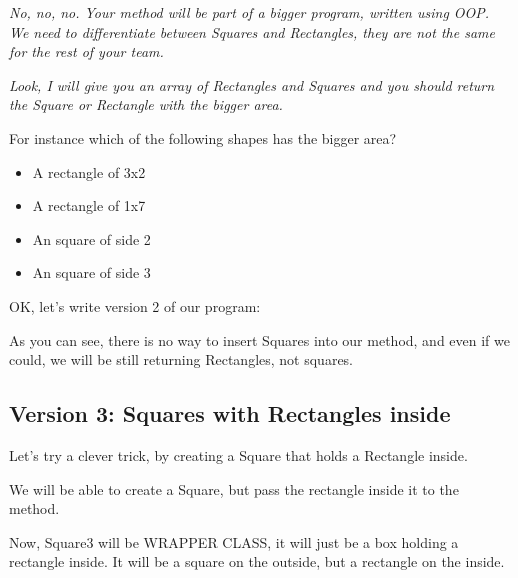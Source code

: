 \documentclass[a4paper, 9pt]{extarticle}
\begin{document}
\textsl{No, no, no. Your method will be part of a bigger program, written using
OOP. We need to differentiate between Squares and Rectangles, they are not the
same for the rest of your team.}

\textsl{Look, I will give you an array of Rectangles and Squares and you should
return the Square or Rectangle with the bigger area.}

For instance which of the following shapes has the bigger area?

\begin{itemize}
  \item A rectangle of 3x2
  \item A rectangle of 1x7
  \item An square of side 2
  \item An square of side 3
\end{itemize}

OK, let's write version 2 of our program:

\begin{multicols}{2}
\columnbreak
\end{multicols}

As you can see, there is no way to insert Squares into our method, and even if
we could, we will be still returning Rectangles, not squares.

\subsection{Version 3: Squares with Rectangles inside}

Let's try a clever trick, by creating a Square that holds a Rectangle inside.

We will be able to create a Square, but pass the rectangle inside it to the
method.

Now, Square3 will be WRAPPER CLASS, it will just be a box holding a rectangle
inside. It will be a square on the outside, but a rectangle on the inside.

\begin{multicols}{2}
\columnbreak
\end{multicols}

\end{document}
